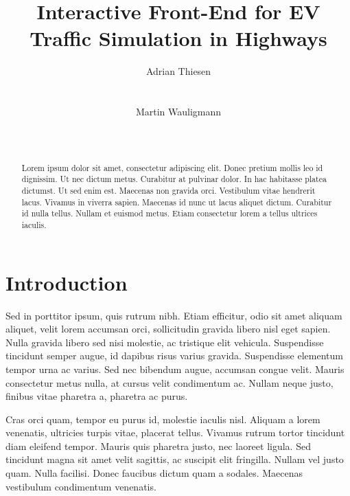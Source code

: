 \documentclass{sig-alternate}
\begin{document}
\title{Interactive Front-End for EV Traffic Simulation in Highways}



\author{
\alignauthor Adrian Thiesen\\
       \\
       \\
\alignauthor Martin Wauligmann\\
       \\
       \\
}


\maketitle


\begin{abstract}
Lorem ipsum dolor sit amet, consectetur adipiscing elit. Donec pretium mollis leo id dignissim. Ut nec dictum metus. Curabitur at pulvinar dolor. In hac habitasse platea dictumst. Ut sed enim est. Maecenas non gravida orci. Vestibulum vitae hendrerit lacus. Vivamus in viverra sapien. Maecenas id nunc ut lacus aliquet dictum. Curabitur id nulla tellus. Nullam et euismod metus. Etiam consectetur lorem a tellus ultrices iaculis.
\end{abstract}


\section{Introduction}
Sed in porttitor ipsum, quis rutrum nibh. Etiam efficitur, odio sit amet aliquam aliquet, velit lorem accumsan orci, sollicitudin gravida libero nisl eget sapien. Nulla gravida libero sed nisi molestie, ac tristique elit vehicula. Suspendisse tincidunt semper augue, id dapibus risus varius gravida. Suspendisse elementum tempor urna ac varius. Sed nec bibendum augue, accumsan congue velit. Mauris consectetur metus nulla, at cursus velit condimentum ac. Nullam neque justo, finibus vitae pharetra a, pharetra ac purus.

Cras orci quam, tempor eu purus id, molestie iaculis nisl. Aliquam a lorem venenatis, ultricies turpis vitae, placerat tellus. Vivamus rutrum tortor tincidunt diam eleifend tempor. Mauris quis pharetra justo, nec laoreet ligula. Sed tincidunt magna sit amet velit sagittis, ac suscipit elit fringilla. Nullam vel justo quam. Nulla facilisi. Donec faucibus dictum quam a sodales. Maecenas vestibulum condimentum venenatis.
\end{document}
